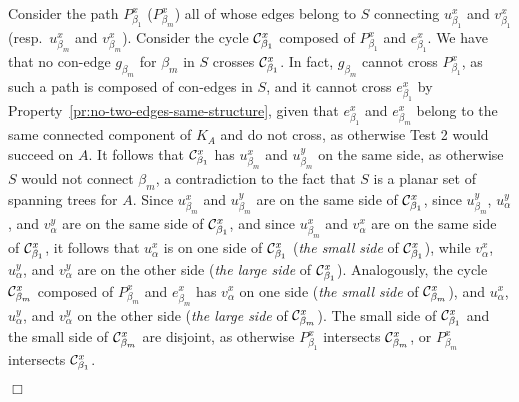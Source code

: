 \documentclass[letter,runningheads]{llncs}
\renewenvironment{proof}
{{\em Proof.\ }}{\hspace*{\fill}$\Box$\par\vspace{2mm}}
\begin{document}
\begin{proof}
Consider the path $P^x_{\beta_1}$ ($P^x_{\beta_m}$) all of whose edges belong to $S$ connecting $u^x_{\beta_1}$ and $v^x_{\beta_1}$ (resp.\ $u^x_{\beta_m}$ and $v^x_{\beta_m}$). Consider the cycle ${\cal C}^x_{\beta_1}$ composed of $P^x_{\beta_1}$ and $e^x_{\beta_1}$. We have that no con-edge $g_{\beta_m}$ for $\beta_m$ in $S$ crosses ${\cal C}^x_{\beta_1}$. In fact, $g_{\beta_m}$ cannot cross $P^x_{\beta_1}$, as such a path is composed of con-edges in $S$, and it cannot cross $e^x_{\beta_1}$ by Property~\ref{pr:no-two-edges-same-structure}, given that $e^x_{\beta_1}$ and $e^x_{\beta_m}$ belong to the same connected component of $K_A$ and do not cross, as otherwise {\sc Test 2} would succeed on $A$. It follows that ${\cal C}^x_{\beta_1}$ has $u^x_{\beta_m}$ and $u^y_{\beta_m}$ on the same side, as otherwise $S$ would not connect $\beta_m$, a contradiction to the fact that $S$ is a planar set of spanning trees for $A$.  Since $u^x_{\beta_m}$ and $u^y_{\beta_m}$ are on the same side of ${\cal C}^x_{\beta_1}$, since $u^y_{\beta_m}$, $u^y_{\alpha}$, and $v^y_{\alpha}$ are on the same side of ${\cal C}^x_{\beta_1}$, and since $u^x_{\beta_m}$ and $v^x_{\alpha}$ are on the same side of ${\cal C}^x_{\beta_1}$, it follows that $u^x_{\alpha}$ is on one side of ${\cal C}^x_{\beta_1}$ ({\em the small side} of ${\cal C}^x_{\beta_1}$), while $v^x_{\alpha}$, $u^y_{\alpha}$, and $v^y_{\alpha}$ are on the other side ({\em the large side} of ${\cal C}^x_{\beta_1}$). Analogously, the cycle ${\cal C}^x_{\beta_m}$ composed of $P^x_{\beta_m}$ and $e^x_{\beta_m}$ has $v^x_{\alpha}$ on one side ({\em the small side} of ${\cal C}^x_{\beta_m}$), and $u^x_{\alpha}$, $u^y_{\alpha}$, and $v^y_{\alpha}$ on the other side ({\em the large side} of ${\cal C}^x_{\beta_m}$). The small side of ${\cal C}^x_{\beta_1}$ and the small side of ${\cal C}^x_{\beta_m}$ are disjoint, as otherwise $P^x_{\beta_1}$ intersects ${\cal C}^x_{\beta_m}$, or $P^x_{\beta_m}$ intersects ${\cal C}^x_{\beta_1}$.


\end{proof}
\end{document}
